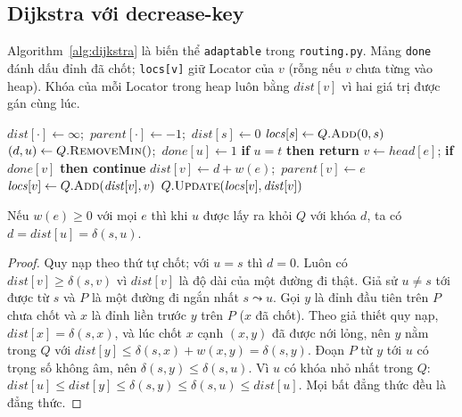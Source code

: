 \subsection{Dijkstra với decrease-key}

Algorithm~\ref{alg:dijkstra} là biến thể \texttt{adaptable} trong \texttt{routing.py}. Mảng \texttt{done} đánh dấu đỉnh đã chốt; \texttt{locs[v]} giữ Locator của $v$ (rỗng nếu $v$ chưa từng vào heap). Khóa của mỗi Locator trong heap luôn bằng $\mathit{dist}[v]$ vì hai giá trị được gán cùng lúc.

\begin{algorithm}[t]
\caption{Dijkstra dùng AdaptableHeapPQ, dừng sớm tại $t$}
\label{alg:dijkstra}
\begin{algorithmic}[1]
  \State $\mathit{dist}[\cdot] \gets \infty$;\ $\mathit{parent}[\cdot] \gets -1$;\ $\mathit{dist}[s] \gets 0$
  \State $\mathit{locs}[s] \gets Q.\textsc{Add}(0, s)$
    \State $(d, u) \gets Q.\textsc{RemoveMin}()$;\ $\mathit{done}[u] \gets 1$
    \State \textbf{if} $u = t$ \textbf{then return}
      \State $v \gets \mathit{head}[e]$; \textbf{if} $\mathit{done}[v]$ \textbf{then continue}
        \State $\mathit{dist}[v] \gets d + w(e)$;\ $\mathit{parent}[v] \gets e$
          \State $\mathit{locs}[v] \gets Q.\textsc{Add}(\mathit{dist}[v], v)$
        \Else
          \State $Q.\textsc{Update}(\mathit{locs}[v], \mathit{dist}[v])$ 
        \EndIf
      \EndIf
    \EndFor
  \EndWhile
\EndProcedure
\end{algorithmic}
\end{algorithm}

\begin{lemma}\label{lem:dijkstra}
Nếu $w(e) \ge 0$ với mọi $e$ thì khi $u$ được lấy ra khỏi $Q$ với khóa $d$, ta có $d = \mathit{dist}[u] = \delta(s,u)$.
\end{lemma}
\begin{proof}
Quy nạp theo thứ tự chốt; với $u=s$ thì $d=0$. Luôn có $\mathit{dist}[v] \ge \delta(s,v)$ vì $\mathit{dist}[v]$ là độ dài của một đường đi thật. Giả sử $u \ne s$ tới được từ $s$ và $P$ là một đường đi ngắn nhất $s \leadsto u$. Gọi $y$ là đỉnh đầu tiên trên $P$ chưa chốt và $x$ là đỉnh liền trước $y$ trên $P$ ($x$ đã chốt). Theo giả thiết quy nạp, $\mathit{dist}[x] = \delta(s,x)$, và lúc chốt $x$ cạnh $(x,y)$ đã được nới lỏng, nên $y$ nằm trong $Q$ với $\mathit{dist}[y] \le \delta(s,x) + w(x,y) = \delta(s,y)$. Đoạn $P$ từ $y$ tới $u$ có trọng số không âm, nên $\delta(s,y) \le \delta(s,u)$. Vì $u$ có khóa nhỏ nhất trong $Q$: $\mathit{dist}[u] \le \mathit{dist}[y] \le \delta(s,y) \le \delta(s,u) \le \mathit{dist}[u]$. Mọi bất đẳng thức đều là đẳng thức.
\end{proof}

